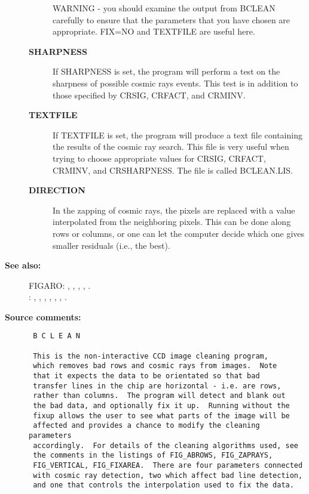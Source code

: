 \begin{description}
\begin{description}
 WARNING - you should examine the output from BCLEAN carefully
           to ensure that the parameters that you have chosen
           are appropriate. FIX=NO and TEXTFILE are useful here.
\item [{\bf SHARPNESS}]
 If SHARPNESS is set, the program will perform a test on
 the sharpness of possible cosmic rays events. This test is in
 addition to those specified by CRSIG, CRFACT, and CRMINV.
\item [{\bf TEXTFILE}]
 If TEXTFILE is set, the program will produce a text file
 containing the results of the cosmic ray search.  This file
 is very useful when trying to choose appropriate values for
 CRSIG, CRFACT, CRMINV, and CRSHARPNESS. The file is called
 BCLEAN.LIS.
\item [{\bf DIRECTION}]
 In the zapping of cosmic rays, the pixels are replaced with
 a value interpolated from the neighboring pixels. This can
 be done along rows or columns, or one can let the computer
 decide which one gives smaller residuals (i.e., the best).
\end{description}

\item [{\bf See also:}]
FIGARO: , , , , .\\
: , , , , , , .\\

\item [{\bf Source comments:}]
\begin{verbatim}
 B C L E A N

 This is the non-interactive CCD image cleaning program,
 which removes bad rows and cosmic rays from images.  Note
 that it expects the data to be orientated so that bad
 transfer lines in the chip are horizontal - i.e. are rows,
 rather than columns.  The program will detect and blank out
 the bad data, and optionally fix it up.  Running without the
 fixup allows the user to see what parts of the image will be
 affected and provides a chance to modify the cleaning parameters
 accordingly.  For details of the cleaning algorithms used, see
 the comments in the listings of FIG_ABROWS, FIG_ZAPRAYS,
 FIG_VERTICAL, FIG_FIXAREA.  There are four parameters connected
 with cosmic ray detection, two which affect bad line detection,
 and one that controls the interpolation used to fix the data.


\end{verbatim}
\end{description}
